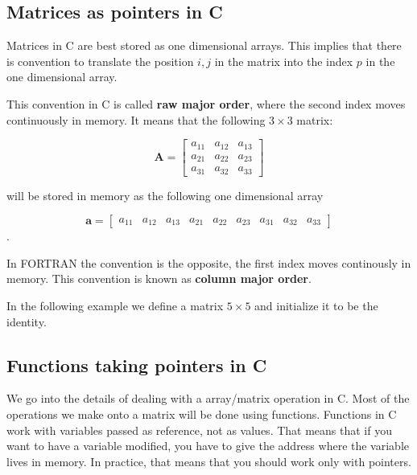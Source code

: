 \documentclass{article}
\begin{document}
\subsection{Matrices as pointers in C}
Matrices in C are best stored as one dimensional arrays. This implies
that there is convention to translate the position $i,j$ in the matrix
into the index $p$ in the one dimensional array.  

This convention in C is called {\bf raw major order}, where the second
index moves continuously in memory. It means that the following
$3\times 3$ matrix: 


\begin{displaymath}
\mathbf{A} = 
\left[
\begin{array}{ccc}
a_{11}  & a_{12} & a_{13}   \\
a_{21}  & a_{22}   & a_{23}  \\
a_{31}  & a_{32} & a_{33}   
\end{array}
\right]
\end{displaymath}

will be stored in memory as the following one dimensional array

\begin{displaymath}
\mathbf{a} = 
\left[
\begin{array}{ccccccccc}
a_{11}  & a_{12} & a_{13}   & a_{21}  & a_{22}   & a_{23}  & a_{31}  & a_{32} & a_{33}   
\end{array}
\right]
\end{displaymath}.

In FORTRAN the convention is the opposite, the first index moves
continously in memory. This convention is known as {\bf column major
  order}.  

In the following example we define a matrix $5\times 5$ and initialize it to be 
the identity. 




\subsection{Functions taking pointers in C}
We go into the details of dealing with a array/matrix operation in
C. Most of the operations we make onto a matrix will be done using
functions. Functions in C work with variables passed as reference, not
as values. That means that if you want to have a variable modified,
you have to give the address where the variable lives in memory. In
practice, that means that you should work only with pointers. 
\end{document}
